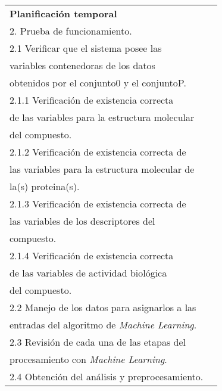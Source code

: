 \begin{longtable}{|l|l|}
\textbf{Planificación temporal}                                                         & \begin{tabular}[c]{@{}l@{}}1. Prueba de compilación.\\ 2. Prueba de funcionamiento.\\ 2.1 Verificar que el sistema posee las \\ variables contenedoras de los datos \\ obtenidos por el conjunto0 y el conjuntoP.\\ 2.1.1 Verificación de existencia correcta \\ de las variables para la estructura molecular \\ del compuesto.\\ 2.1.2 Verificación de existencia correcta de \\ las variables para la estructura molecular de \\ la(s) proteina(s).\\ 2.1.3 Verificación de existencia correcta de \\ las variables de los descriptores del \\ compuesto.\\ 2.1.4 Verificación de existencia correcta \\ de las variables de actividad biológica \\ del compuesto.\\ 2.2 Manejo de los datos para asignarlos a las \\ entradas del algoritmo de \textit{Machine Learning}.\\ 2.3  Revisión de cada una de las etapas del \\ procesamiento con \textit{Machine Learning}. \\ 2.4 Obtención del análisis y preprocesamiento.\end{tabular} \\ \hline

\end{longtable}
